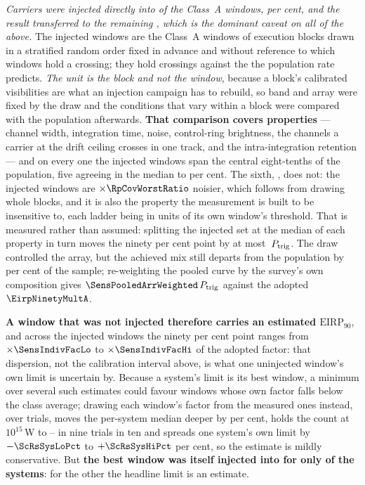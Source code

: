 \emph{Carriers were injected directly into \SensNInj{} of the \NWinA{}
Class~A windows, \SensNInjPct{} per cent, and the result transferred to the
remaining \SensNTransfer, which is the dominant caveat on all of the above.}
The injected windows are the Class~A windows of execution blocks drawn in a
stratified random order fixed in advance and without reference to which
windows hold a crossing; they hold \SensNCrossAch{} crossings against the
\SensNCrossExp{} the population rate predicts. \emph{The unit is the block and
not the window}, because a block's calibrated visibilities are what an
injection campaign has to rebuild, so band and array were fixed by the draw
and the conditions that vary within a block were compared with the population
afterwards. \textbf{That comparison covers \RpNAxis{} properties} --- channel
width, integration time, noise, control-ring brightness, the channels a
carrier at the drift ceiling crosses in one track, and the intra-integration
retention --- and on every one the injected windows span the central
eight-tenths of the population, five agreeing in the median to
\RpCovOtherPct{} per cent. The sixth, \RpCovWorstAxis, does not: the injected
windows are $\times\RpCovWorstRatio$ noisier, which follows from drawing whole
blocks, and it is also the property the measurement is built to be
insensitive to, each ladder being in units of its own window's threshold.
That is measured rather than assumed: splitting the injected set at the median
of each property in turn moves the ninety per cent point by at most
\RpFacShiftMax\,$P_{\rm trig}$. The draw controlled the array, but the
achieved mix still departs from the population by \SensCovWorstPct{} per cent
of the sample; re-weighting the pooled curve by the survey's own composition
gives
$\SensPooledArrWeighted\,P_{\rm trig}$ against the adopted
$\EirpNinetyMultA$.

\textbf{A window that was not injected therefore carries an estimated
$\mathrm{EIRP}_{90}$}, and across the injected windows the ninety per cent
point ranges from $\times\SensIndivFacLo$ to $\times\SensIndivFacHi$ of the
adopted factor: that dispersion, not the calibration interval above, is what
one uninjected window's own limit is uncertain by. Because a system's limit is
its best window, a minimum over several such estimates could favour windows
whose own factor falls below the class average; drawing each window's factor
from the \SensNInj{} measured ones instead, over \ScRsNTrial{} trials, moves
the per-system median deeper by \ScRsMedShiftPct{} per cent, holds the count
at $10^{15}$\,W to \ScRsNLo--\ScRsNHi{} in nine trials in ten and spreads one
system's own limit by $-\ScRsSysLoPct$ to $+\ScRsSysHiPct$ per cent, so the
estimate is mildly conservative. But \textbf{the best window was itself injected into for only
\SmcNMeasSys{} of the \NSysClassA{} systems}: for the other \SmcNEstSys{} the
headline limit is an estimate.

